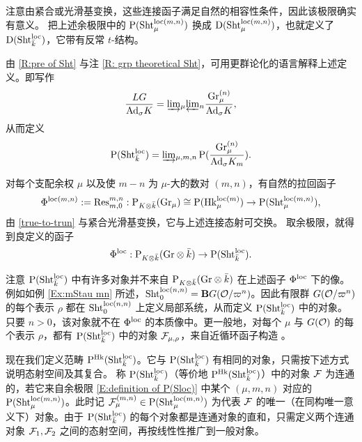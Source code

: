 注意由紧合或光滑基变换，这些连接函子满足自然的相容性条件，因此该极限确实有意义。
把上述余极限中的 $\operatorname{P}(\operatorname{Sht}_{\mu}^{\mathrm{loc}(m, n)})$ 换成 $\operatorname{D}(\operatorname{Sht}_{\mu}^{\mathrm{loc}(m, n)})$，也就定义了 $\operatorname{D}(\operatorname{Sht}_{\bar k}^{\mathrm{loc}})$，它带有反常 $t$-结构。

\begin{rmk}
\label{R: sheaves on Shtloc}
由 \eqref{R:pre of Sht} 与注 \ref{R: grp theoretical Sht}，可用更群论化的语言解释上述定义。即写作
\[\frac{LG}{{\operatorname{Ad}}_\sigma K}=\underrightarrow\lim_{\mu}\underleftarrow\lim_n \frac{{\operatorname{Gr}}_\mu^{(n)}}{{\operatorname{Ad}}_\sigma K},\]
从而定义
\[\operatorname{P}(\operatorname{Sht}^{\mathrm{loc}}_{\bar k})=\underrightarrow\lim_{\mu,m,n}\operatorname{P}(\frac{{\operatorname{Gr}}^{(n)}_\mu}{{\operatorname{Ad}}_\sigma K_m}).\]
\end{rmk}

对每个支配余权 $\mu$ 以及使 $m-n$ 为 $\mu$-大的数对 $(m,n)$，有自然的拉回函子
\begin{equation*}
\label{E:functor P(Hk) to P(S)fin}
\Phi^{\mathrm{loc}(m,n)}:={\operatorname{Res}}^{m,n}_{m,0}: \operatorname{P}_{K\otimes \bar k}({\operatorname{Gr}}_\mu)\cong \operatorname{P}({\operatorname{Hk}}_\mu^{\mathrm{loc}(m)})\to \operatorname{P}(\operatorname{Sht}_\mu^{\mathrm{loc}(m,n)}),
\end{equation*}
由 \eqref{true-to-trun} 与紧合光滑基变换，它与上述连接态射可交换。
取余极限，就得到良定义的函子
\begin{equation}
\label{E:functor P(Hk) to P(S)}
\Phi^{\mathrm{loc}}: \mathrm{P}_{K\otimes\bar k}({\operatorname{Gr}}\otimes\bar k) \to \mathrm{P}(\operatorname{Sht}_{\bar k}^{\mathrm{loc}}).
\end{equation}

\begin{rmk}
\label{R: more object}
注意 $\mathrm{P}(\operatorname{Sht}_{\bar k}^{\mathrm{loc}})$ 中有许多对象并不来自 $\operatorname{P}_{K\otimes \bar k}({\operatorname{Gr}}\otimes\bar k)$ 在上述函子 $\Phi^{\mathrm{loc}}$ 下的像。例如如例 \ref{Ex:mStau mn} 所述，$\operatorname{Sht}^{\mathrm{loc}(n,n)}_0={\mathbf{B}} G({\mathcal O}/\varpi^n)$。因此有限群 $G({\mathcal O}/\varpi^n)$ 的每个表示 $\rho$ 都在 $\operatorname{Sht}^{\mathrm{loc}(n,n)}_0$ 上定义局部系统，从而定义 $\mathrm{P}(\operatorname{Sht}_{\bar k}^{\mathrm{loc}})$ 中的对象。只要 $n>0$，该对象就不在 $\Phi^{\mathrm{loc}}$ 的本质像中。更一般地，对每个 $\mu$ 与 $G({\mathcal O})$ 的每个表示 $\rho$，都有 $\mathrm{P}(\operatorname{Sht}_{\bar k}^{\mathrm{loc}})$ 中的对象 ${\mathcal F}_{\mu,\rho}$，来自近循环函子构造 \cite{GL}。
\end{rmk}

现在我们定义范畴 $\mathrm{P}^{{\operatorname{Hk}}}(\operatorname{Sht}^{\mathrm{loc}}_{\bar k})$。它与 $\mathrm{P}(\operatorname{Sht}_{\bar k}^{\mathrm{loc}})$ 有相同的对象，只需按下述方式说明态射空间及其复合。
称 $\mathrm{P}(\operatorname{Sht}_{\bar k}^{\mathrm{loc}})$（等价地 $\mathrm{P}^\mathrm{Hk}(\operatorname{Sht}^{\mathrm{loc}}_{\bar k})$）中的对象 ${\mathcal F}$ 为连通的，若它来自余极限 \eqref{E:definition of P(Sloc)} 中某个 $(\mu,m, n)$ 对应的 $\mathrm{P}(\operatorname{Sht}_\mu^{\mathrm{loc}(m,n)})$。此时记 ${\mathcal F}_\mu^{(m,n)}\in \mathrm{P}(\operatorname{Sht}_\mu^{\mathrm{loc}(m,n)})$ 为代表 ${\mathcal F}$ 的唯一（在同构唯一意义下）对象。由于 $\mathrm{P}(\operatorname{Sht}_{\bar k}^{\mathrm{loc}})$ 的每个对象都是连通对象的直和，只需定义两个连通对象 $\mathcal{F}_1, \mathcal{F}_2$ 之间的态射空间，再按线性性推广到一般对象。

